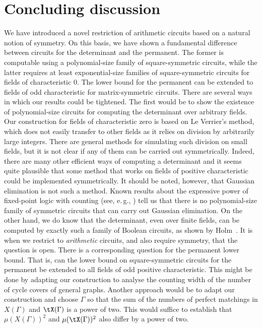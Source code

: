 \documentclass[11pt]{article}
\newcommand{\eg}{e.\,g.}
\begin{document}
\section{Concluding discussion}
We have introduced a novel restriction of arithmetic circuits based on a natural
notion of symmetry. On this basis, we have shown a fundamental difference
between circuits for the determinant and the permanent.  The former is computable
using a polynomial-size family of
square-symmetric circuits, while the latter requires at least exponential-size
families of square-symmetric circuits for fields of characteristic $0$.  The
lower bound for the permanent can be extended to fields of odd
%
characteristic for matrix-symmetric circuits.
There are several ways in which our results could be tightened. The first would
be to show the existence of polynomial-size circuits for computing the
determinant over arbitrary fields.  Our construction for fields of characteristic
zero is based on Le Verrier's method, which does not easily transfer to other
fields as it relies on division by arbitrarily large integers.  There are general
methods for simulating such division on small fields, but it is not clear if any
of them can be carried out symmetrically.  Indeed, there are many other efficient
ways of computing a determinant and it seems quite plausible that some method that
works on fields of positive characteristic could be implemented symmetrically.
It should be noted, however, that Gaussian elimination is not such a method.
Known results about the expressive power of fixed-point logic with counting
(see, \eg, \cite{Dawar15}) tell us that there is no polynomial-size family of
symmetric circuits that can carry out Gaussian elimination.  On the other hand,
we do know that the determinant, even over finite fields, can be computed by
exactly such a family of Boolean circuits, as shown by Holm~\cite{Holm10}.  It is
when we restrict to \emph{arithmetic} circuits, and also require symmetry, that
the question is open.
There is a corresponding question for the permanent lower bound. That is, can the
lower bound on square-symmetric circuits for the permanent be extended to all
fields of odd positive characteristic. This might be done by adapting our
construction to analyse the counting width of the number of cycle covers of
general graphs. Another approach would be to adapt our construction and choose
$\Gamma$ so that the sum of the numbers of perfect matchings in $X(\Gamma)$ and $\tX(\Gamma)$
is a power of two.  This would suffice to establish that $\mu(X(\Gamma))^2$ and $\mu(\tX(\Gamma))^2$ also differ by a power of two.
\end{document}
